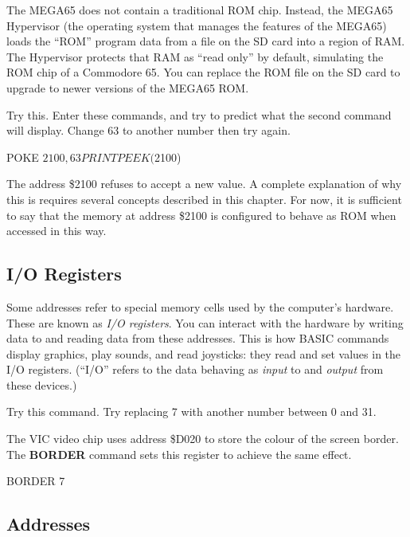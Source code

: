 The MEGA65 does not contain a traditional ROM chip. Instead, the MEGA65
Hypervisor (the operating system that manages the features of the MEGA65)
loads the ``ROM'' program data from a file on the SD card into a region of RAM.
The Hypervisor protects that RAM as ``read only'' by default, simulating the ROM
chip of a Commodore 65. You can replace the ROM file on the SD card to upgrade
to newer versions of the MEGA65 ROM.

Try this. Enter these commands, and try to predict what the second command will
display. Change 63 to another number then try again.

\begin{basiccode}
POKE $2100,63
PRINT PEEK($2100)
\end{basiccode}

The address \$2100 refuses to accept a new value. A complete explanation
of why this is requires several concepts described in this chapter. For now, it
is sufficient to say that the memory at address \$2100 is configured to behave
as ROM when accessed in this way.

\subsection{I/O Registers}

Some addresses refer to special memory cells used by the computer's hardware.
These are known as {\em I/O registers}. You can interact with the hardware by
writing data to and reading data from these addresses. This is how BASIC
commands display graphics, play sounds, and read joysticks: they read and set
values in the I/O registers. (``I/O'' refers to the data behaving as
\emph{input} to and \emph{output} from these devices.)

Try this command. Try replacing 7 with another number between 0 and 31.


The VIC video chip uses address \$D020 to store the colour of the screen border.
The {\bf BORDER} command sets this register to achieve the same effect.

\begin{basiccode}
BORDER 7
\end{basiccode}

\subsection{Addresses}

